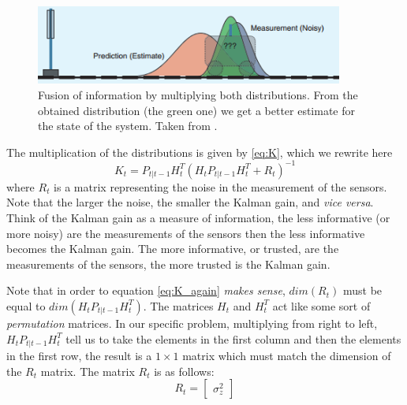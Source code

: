 \documentclass[12pt,a4paper,final]{article} %
\begin{document}
\begin{figure}
  \centering
  \includegraphics[width=0.90\textwidth]{object_1D_04}
  \caption{Fusion of information by multiplying both
    distributions. From the obtained distribution (the green one) we
    get a better estimate for the state of the system. Taken from
    \cite{Faragher:2012:AR}.}
  \label{fig:object_1D_04}
\end{figure}

The multiplication of the distributions is given by \eqref{eq:K},
which we rewrite here
\begin{equation}
  \label{eq:K_again}
  K_t= P_{t|t-1} H_t^T (H_t P_{t|t-1} H_t^T+R_t)^{-1}
\end{equation}
where $R_t$ is a matrix representing the noise in the measurement of
the sensors. Note that the larger the noise, the smaller the Kalman
gain, and \textit{vice versa}. Think of the Kalman gain as a measure
of information, the less informative (or more noisy) are the
measurements of the sensors then the less informative becomes the
Kalman gain. The more informative, or trusted, are the measurements of
the sensors, the more trusted is the Kalman gain.

Note that in order to equation \eqref{eq:K_again} \textit{makes
  sense}, $dim(R_t)$ must be equal to $dim(H_t P_{t|t-1} H_t^T)$. The
matrices $H_t$ and $H_t^T$ act like some sort of \textit{permutation}
matrices. In our specific problem, multiplying from right to left,
$H_t P_{t|t-1} H_t^T$ tell us to take the elements in the first column
and then the elements in the first row, the result is a $1 \times 1$
matrix which must match the dimension of the $R_t$ matrix. The matrix
$R_t$ is as follows:
\begin{equation}
  \label{eq:noise_measurements}
  R_t = 
  \begin{bmatrix}
    \sigma_z^2
  \end{bmatrix}
\end{equation}
\end{document}
